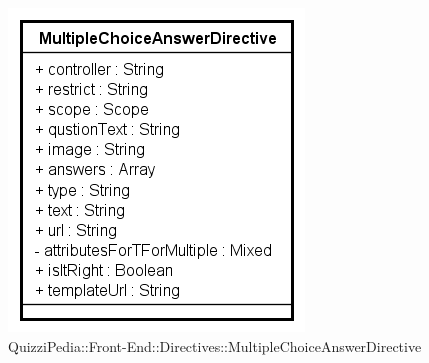		\label{QuizziPedia::Front-End::Directives::MultipleChoiceAnswerDirective}
		
		\begin{figure}[ht]
			\centering
			\includegraphics[scale=0.80,keepaspectratio]{UML/Classi/Front-End/QuizziPedia_Front-end_Templates_MultipleChoiceAnswerTemplate.png}
			\caption{QuizziPedia::Front-End::Directives::MultipleChoiceAnswerDirective}
		\end{figure} \FloatBarrier
		
